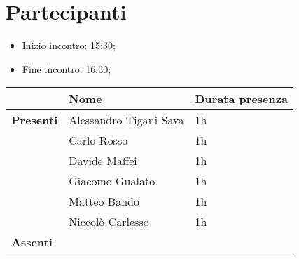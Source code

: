 \section{Partecipanti}

\begin{itemize}
    \item Inizio incontro: 15:30;
    \item Fine incontro: 16:30;
\end{itemize}


\begin{center}
{\renewcommand{\arraystretch}{1.5}
\begin{tabular}{lll}
	                    & \textbf{Nome}  & \textbf{Durata presenza} \\
	\hline
	\textbf{Presenti}   & Alessandro Tigani Sava	& 1h	\\  
						& Carlo Rosso  				& 1h	\\
						& Davide Maffei          	& 1h	\\ 
						& Giacomo Gualato 			& 1h 	\\
						& Matteo Bando           	& 1h	\\   
						& Niccolò Carlesso 			& 1h 	\\  
	\hline
	\textbf{Assenti}	&             				&      	\\
\end{tabular}	
}
\end{center}